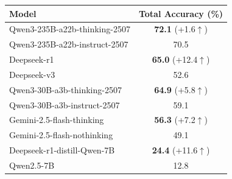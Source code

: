 \label{tab:simplified_model_performance}
\centering
\footnotesize\setlength{\tabcolsep}{3pt}
\renewcommand{\arraystretch}{1.1} 
\begin{tabular}{lc}
\toprule
\textbf{Model} & \textbf{Total Accuracy (\%)} \\
\midrule

Qwen3-235B-a22b-thinking-2507 & \textbf{72.1} {\color{black} (+1.6$\uparrow$)} \\
Qwen3-235B-a22b-instruct-2507 & 70.5 \\
\midrule

Deepseek-r1 & \textbf{65.0} {\color{black} (+12.4$\uparrow$)} \\
Deepseek-v3 & 52.6 \\
\midrule

Qwen3-30B-a3b-thinking-2507 & \textbf{64.9} {\color{black} (+5.8$\uparrow$)} \\
Qwen3-30B-a3b-instruct-2507 & 59.1 \\
\midrule

Gemini-2.5-flash-thinking & \textbf{56.3} {\color{black} (+7.2$\uparrow$)} \\
Gemini-2.5-flash-nothinking & 49.1 \\
\midrule

Deepseek-r1-distill-Qwen-7B & \textbf{24.4} {\color{black} (+11.6$\uparrow$)} \\
Qwen2.5-7B & 12.8 \\

\bottomrule
\end{tabular}
